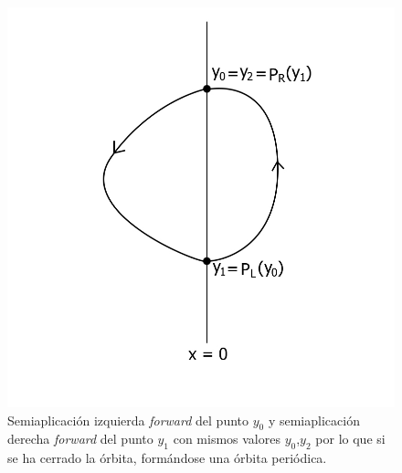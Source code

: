 \documentclass[12pt,a4paper]{report} %
\begin{document}
	\begin{figure}[h]
		\centering
 		\includegraphics[width=1\textwidth]{aplipoincareLRcerrado.jpg}
		\caption{Semiaplicación izquierda \textit{forward} del punto $y_0$ y semiaplicación derecha \textit{forward} del punto $y_1$ con mismos valores $y_0$,$y_2$ por lo que si se ha cerrado la órbita, formándose una órbita periódica.}
		\label{fig:aplipoincareLRcerrado}
	\end{figure}\smallskip
	
	\newpage
	
\end{document}
